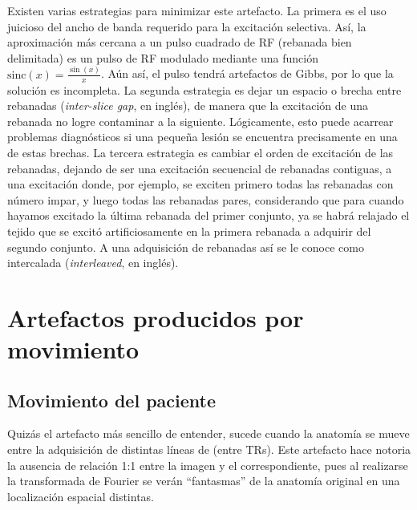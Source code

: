 Existen varias estrategias para minimizar este artefacto. La primera es el uso juicioso del ancho de banda requerido para la excitación selectiva. Así, la aproximación más cercana a un pulso cuadrado de RF (rebanada bien delimitada) es un pulso de RF modulado mediante una función $\mathrm{sinc}(x)=\frac{\sin(x)}{x}$. Aún así, el pulso tendrá artefactos de Gibbs, por lo que la solución es incompleta. La segunda estrategia es dejar un espacio o brecha entre rebanadas (\textit{inter-slice gap}, en inglés), de manera que la excitación de una rebanada no logre contaminar a la siguiente. Lógicamente, esto puede acarrear problemas diagnósticos si una pequeña lesión se encuentra precisamente en una de estas brechas. La tercera estrategia es cambiar el orden de excitación de las rebanadas, dejando de ser una excitación secuencial de rebanadas contiguas, a una excitación donde, por ejemplo, se exciten primero todas las rebanadas con número impar, y luego todas las rebanadas pares, considerando que para cuando hayamos excitado la última rebanada del primer conjunto, ya se habrá relajado el tejido que se excitó artificiosamente en la primera rebanada a adquirir del segundo conjunto. A una adquisición de rebanadas así se le conoce como intercalada (\textit{interleaved}, en inglés).


\section{Artefactos producidos por movimiento}
\subsection{Movimiento del paciente}
Quizás el artefacto más sencillo de entender, sucede cuando la anatomía se mueve entre la adquisición de distintas líneas de \espaciok (entre TRs). Este artefacto hace notoria la ausencia de relación 1:1 entre la imagen y el \espaciok correspondiente, pues al realizarse la transformada de Fourier se verán ``fantasmas'' de la anatomía original en una localización espacial distintas.

